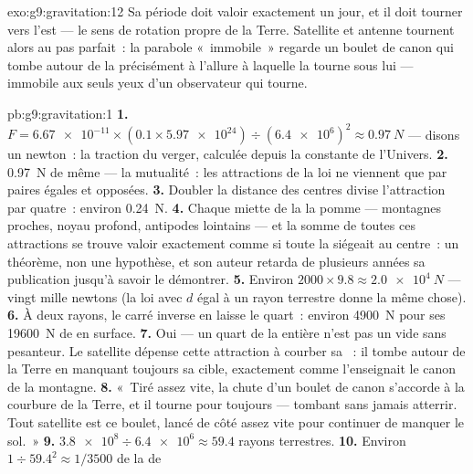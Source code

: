 \begin{solution}{exo:g9:gravitation:12}
Sa période doit valoir exactement un jour, et il doit tourner vers
l'est --- le sens de rotation propre de la Terre. Satellite et antenne
tournent alors au pas parfait~: la parabole «~immobile~» regarde un
boulet de canon qui tombe autour de la  précisément à l'allure
à laquelle la  tourne sous lui --- immobile aux seuls yeux d'un
observateur qui tourne.
\end{solution}

\begin{solution}{pb:g9:gravitation:1}
\textbf{1.} $F = \num{6.67e-11} \times (0.1 \times
\num{5.97e24}) \div (\num{6.4e6})^2 \approx \qty{0.97}{N}$ --- disons
un newton~: la traction du verger, calculée depuis la constante de
l'Univers.
\textbf{2.} \qty{0.97}{N} de même --- la mutualité~: les attractions
de la loi ne viennent que par paires égales et opposées.
\textbf{3.} Doubler la distance des centres divise l'attraction par
quatre~: environ \qty{0.24}{N}.
\textbf{4.} Chaque miette de la   la pomme --- montagnes
proches, noyau profond, antipodes lointains --- et la somme de toutes
ces attractions se trouve valoir exactement comme si toute la 
siégeait au centre~: un théorème, non une hypothèse, et son auteur
retarda de plusieurs années sa publication jusqu'à savoir le
démontrer.
\textbf{5.} Environ $2000 \times 9.8 \approx \qty{2.0e4}{N}$ --- vingt
mille newtons (la loi avec $d$ égal à un rayon terrestre donne la
même chose).
\textbf{6.} À deux rayons, le carré inverse en laisse le quart~:
environ \qty{4900}{N} pour ses \qty{19600}{N} de  en surface.
\textbf{7.} Oui --- un quart de la  entière n'est pas un
vide sans pesanteur. Le satellite dépense cette attraction à courber
sa ~: il tombe autour de la Terre en manquant toujours sa
cible, exactement comme l'enseignait le canon de la montagne.
\textbf{8.} «~Tiré assez vite, la chute d'un boulet de canon
s'accorde à la courbure de la Terre, et il tourne pour toujours ---
tombant sans jamais atterrir. Tout satellite est ce boulet, lancé de
côté assez vite pour continuer de manquer le sol.~»
\textbf{9.} $\num{3.8e8} \div \num{6.4e6} \approx 59.4$ rayons
terrestres.
\textbf{10.} Environ $1 \div 59.4^2 \approx 1/3500$ de la  de

\end{solution}
